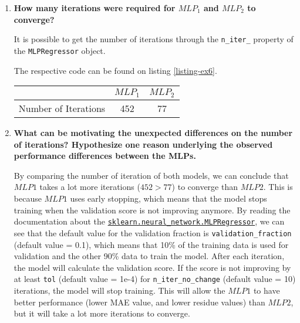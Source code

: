 \documentclass[12pt]{article}
\begin{document}
\begin{enumerate}[leftmargin=\labelsep,resume]
    \item {\color{questioncolor}\bfseries
          How many iterations were required for $MLP_1$ and $MLP_2$ to converge?
          }\\
          \vspace{0.5em}

          It is possible to get the number of iterations through the
          \texttt{n\_iter\_} property of the \texttt{MLPRegressor} object.

          The respective code can be found on listing \ref{listing-ex6}.

          \begin{center}
              \captionsetup{type=table}
              \begin{tabular}{c|c|c}
                                       & $MLP_1$ & $MLP_2$ \\
                  \hline
                  Number of Iterations & 452     & 77
              \end{tabular}
          \end{center}

    \item {\color{questioncolor}\bfseries
          What can be motivating the unexpected differences on the number of iterations?
          Hypothesize one reason underlying the observed performance differences between the MLPs.
          }\\
          \vspace{0.5em}

          By comparing the number of iteration of both models, we can conclude that
          $MLP1$ takes a lot more iterations ($452 > 77$) to converge than $MLP2$.
          This is because $MLP1$ uses early stopping, which means that the model
          stops training when the validation score is not improving anymore.
          By reading the documentation about the
          \href{https://scikit-learn.org/stable/modules/generated/sklearn.neural_network.MLPRegressor.html}{\texttt{sklearn.neural\_network.MLPRegressor}},
          we can see that the default value for the validation fraction is
          \texttt{validation\_fraction} (default value = 0.1), which means that 10\%
          of the training data is used for validation and the other 90\% data
          to train the model.
          After each iteration, the model will calculate the validation score.
          If the score is not improving by at least \texttt{tol} (default value = 1e-4)
          for \texttt{n\_iter\_no\_change} (default value = 10) iterations,
          the model will stop training.
          This will allow the $MLP1$ to have better performance
          (lower MAE value, and lower residue values) than $MLP2$, but it will take a
          lot more iterations to converge.


\end{enumerate}
\end{document}
